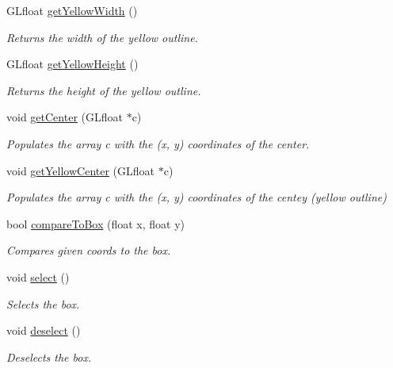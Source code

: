\begin{DoxyCompactItemize}
\mbox{\label{class_box_a9f221be21ff65de421e4c5ec8cfff6f1}} 
G\+Lfloat \hyperlink{class_box_a9f221be21ff65de421e4c5ec8cfff6f1}{get\+Yellow\+Width} ()
\begin{DoxyCompactList}\small\item\em Returns the width of the yellow outline. \end{DoxyCompactList}\item 
\mbox{\label{class_box_a1a623e85953314941573a7172678875f}} 
G\+Lfloat \hyperlink{class_box_a1a623e85953314941573a7172678875f}{get\+Yellow\+Height} ()
\begin{DoxyCompactList}\small\item\em Returns the height of the yellow outline. \end{DoxyCompactList}\item 
void \hyperlink{class_box_afe94c473ef4bb934fc6dd9a554ec4e37}{get\+Center} (G\+Lfloat $\ast$c)
\begin{DoxyCompactList}\small\item\em Populates the array c with the (x, y) coordinates of the center. \end{DoxyCompactList}\item 
void \hyperlink{class_box_a397d78400d99dfc74bb831922f02fa69}{get\+Yellow\+Center} (G\+Lfloat $\ast$c)
\begin{DoxyCompactList}\small\item\em Populates the array c with the (x, y) coordinates of the centey (yellow outline) \end{DoxyCompactList}\item 
bool \hyperlink{class_box_a42ae1534ed54148e5267cffe3f0862e3}{compare\+To\+Box} (float x, float y)
\begin{DoxyCompactList}\small\item\em Compares given coords to the box. \end{DoxyCompactList}\item 
void \hyperlink{class_box_a84cfaee25d2c73c4ba3ac96d281e83b5}{select} ()
\begin{DoxyCompactList}\small\item\em Selects the box. \end{DoxyCompactList}\item 
void \hyperlink{class_box_ad3ac0f85b1b947ab35ca9b1da92ba8e6}{deselect} ()
\begin{DoxyCompactList}\small\item\em Deselects the box. \end{DoxyCompactList}\item 

\end{DoxyCompactItemize}
